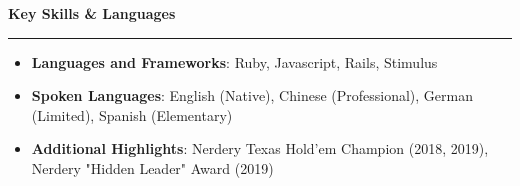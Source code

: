 \documentclass[letterpaper,10pt]{article}
\newcommand{\resheading}[1]{
  \vspace{15pt}
  \textbf{\large #1}
  \vspace{5pt}
  \hrule
  \vspace{10pt}
}
\begin{document}
\resheading{Key Skills \& Languages}
\begin{itemize}
  \item \textbf{Languages and Frameworks}: Ruby, Javascript, Rails, Stimulus
  \item \textbf{Spoken Languages}: English (Native), Chinese (Professional), German (Limited), Spanish (Elementary)
  \item \textbf{Additional Highlights}: Nerdery Texas Hold'em Champion (2018, 2019), Nerdery "Hidden Leader" Award (2019)
\end{itemize}

\end{document}
